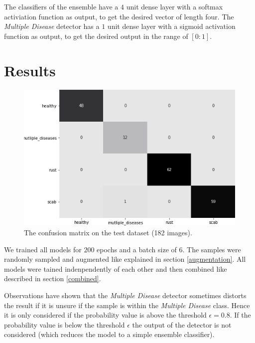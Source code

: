 \documentclass[10pt,twocolumn,letterpaper]{article}
\begin{document}
The classifiers of the ensemble have a $4$ unit dense layer with a softmax activiation function as output, to get the desired vector of length four. The \textit{Multiple Disease} detector has a $1$ unit dense layer with a sigmoid activation function as output, to get the desired output in the range of $[0:1]$.

\section{Results}

\begin{figure}[htb]
\begin{center}
\includegraphics[width=\linewidth]{images/confusion_matrix.png}
\end{center}
   \caption{The confusion matrix on the test dataset (182 images).}
\label{conf_matrix}  
\end{figure}

We trained all models for $200$ epochs and a batch size of $6$. The samples were randomly sampled and augmented like explained in section \ref{augmentation}. All models were tained indenpendently of each other and then combined like described in section \ref{combined}.

Observations have shown that the \textit{Multiple Disease} detector sometimes distorts the result if it is unsure if the sample is within the \textit{Multiple Disease} class. Hence it is only considered if the probability value is above the threshold  $\epsilon = 0.8$. If the probability value is below the threshold $\epsilon$ the output of the detector is not considered (which reduces the model to a simple ensemble classifier).
\end{document}
